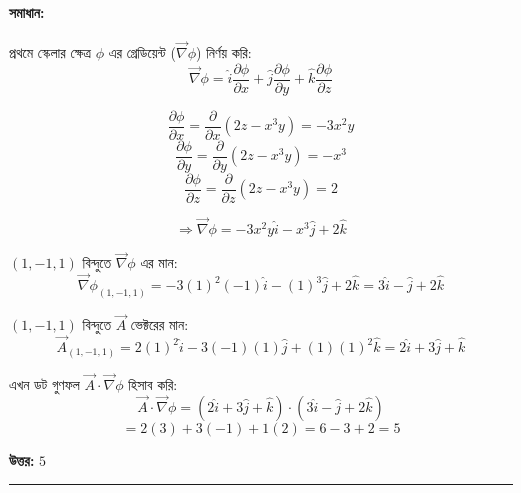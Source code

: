 \documentclass{article}
\begin{document}
\begin{center}
\end{center}

\paragraph{সমাধান:}

প্রথমে স্কেলার ক্ষেত্র $\phi$ এর গ্রেডিয়েন্ট ($\vec{\nabla}\phi$) নির্ণয় করি:
$$\vec{\nabla}\phi = \hat{i}\frac{\partial \phi}{\partial x} + \hat{j}\frac{\partial \phi}{\partial y} + \hat{k}\frac{\partial \phi}{\partial z}$$

$$\frac{\partial \phi}{\partial x} = \frac{\partial}{\partial x}(2z - x^3y) = -3x^2y$$
$$\frac{\partial \phi}{\partial y} = \frac{\partial}{\partial y}(2z - x^3y) = -x^3$$
$$\frac{\partial \phi}{\partial z} = \frac{\partial}{\partial z}(2z - x^3y) = 2$$

$$\Rightarrow \vec{\nabla}\phi = -3x^2y\hat{i} - x^3\hat{j} + 2\hat{k}$$

$(1, -1, 1)$ বিন্দুতে $\vec{\nabla}\phi$ এর মান:
$$\vec{\nabla}\phi_{(1,-1,1)} = -3(1)^2(-1)\hat{i} - (1)^3\hat{j} + 2\hat{k} = 3\hat{i} - \hat{j} + 2\hat{k}$$

$(1, -1, 1)$ বিন্দুতে $\vec{A}$ ভেক্টরের মান:
$$\vec{A}_{(1,-1,1)} = 2(1)^2\hat{i} - 3(-1)(1)\hat{j} + (1)(1)^2\hat{k} = 2\hat{i} + 3\hat{j} + \hat{k}$$

এখন ডট গুণফল $\vec{A} \cdot \vec{\nabla}\phi$ হিসাব করি:
$$\vec{A} \cdot \vec{\nabla}\phi = (2\hat{i} + 3\hat{j} + \hat{k}) \cdot (3\hat{i} - \hat{j} + 2\hat{k})$$
$$= 2(3) + 3(-1) + 1(2) = 6 - 3 + 2 = 5$$

\textbf{উত্তর:} $5$

\vspace{1cm}
\hrule
\vspace{1cm}
\end{document}
